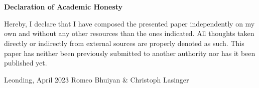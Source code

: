 \thispagestyle{empty}
\vspace{3cm}
~ \\ \\
\textbf{Declaration of Academic Honesty}

Hereby, I declare that I have composed the presented paper independently on my own
and without any other resources than the ones indicated. All thoughts taken directly or
indirectly from external sources are properly denoted as such.
This paper has neither been previously submitted to another authority nor has it
been published yet.
\vspace{3cm}
\begin{tabbing}
Leonding, April 2023 \hspace{5cm} Romeo Bhuiyan \& Christoph Lasinger
\end{tabbing}
\vspace{10cm}
\newpage
\setcounter{page}{1}

